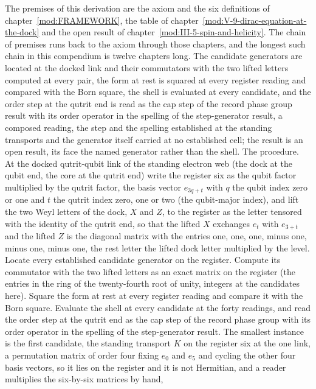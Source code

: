 \begin{chproof}
The premises of this derivation are the axiom and the six definitions of chapter~\ref{mod:FRAMEWORK}, the table of chapter~\ref{mod:V-9-dirac-equation-at-the-dock} and the open result of chapter~\ref{mod:III-5-spin-and-helicity}. The chain of premises runs back to the axiom through those chapters, and the longest such chain in this compendium is twelve chapters long.
The candidate generators are located at the docked link and their commutators with the two lifted letters computed at every pair, the form at rest is squared at every register reading and compared with the Born square, the shell is evaluated at every candidate, and the order step at the qutrit end is read as the cap step of the record phase group result with its order operator in the spelling of the step-generator result, a composed reading, the step and the spelling established at the standing transports and the generator itself carried at no established cell; the result is an open result, its face the named generator rather than the shell.
The procedure. At the docked qutrit-qubit link of the standing electron web (the dock at the qubit end, the core at the qutrit end) write the register six as the qubit factor multiplied by the qutrit factor, the basis vector $e_{3q+t}$ with $q$ the qubit index zero or one and $t$ the qutrit index zero, one or two (the qubit-major index), and lift the two Weyl letters of the dock, $X$ and $Z$, to the register as the letter tensored with the identity of the qutrit end, so that the lifted $X$ exchanges $e_{t}$ with $e_{3+t}$ and the lifted $Z$ is the diagonal matrix with the entries one, one, one, minus one, minus one, minus one, the rest letter the lifted dock letter multiplied by the level. Locate every established candidate generator on the register. Compute its commutator with the two lifted letters as an exact matrix on the register (the entries in the ring of the twenty-fourth root of unity, integers at the candidates here). Square the form at rest at every register reading and compare it with the Born square. Evaluate the shell at every candidate at the forty readings, and read the order step at the qutrit end as the cap step of the record phase group with its order operator in the spelling of the step-generator result. The smallest instance is the first candidate, the standing transport $K$ on the register six at the one link, a permutation matrix of order four fixing $e_{0}$ and $e_{5}$ and cycling the other four basis vectors, so it lies on the register and it is not Hermitian, and a reader multiplies the six-by-six matrices by hand,

\end{chproof}
